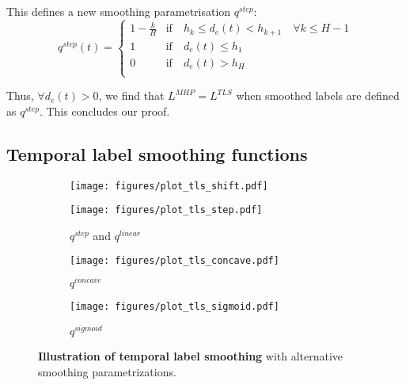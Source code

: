 \documentclass[nohyperref]{article}
\begin{document}
This defines a new smoothing parametrisation $q^{step}$: \begin{equation*}
    q^{step}( t) = 
    \begin{cases}
    1-\frac{k}{H} & \mathrm{if} \quad  h_k \leq  d_e(t) < h_{k+1} \quad \forall k \leq H -1 \\
    1 & \mathrm{if}  \quad d_e(t) \leq h_1 \\     
    0 & \mathrm{if} \quad d_e(t) > h_H \\
    \end{cases}
\end{equation*}

Thus, $\forall d_e(t) > 0$, we find that $L^{MHP} = L^{TLS}$ when smoothed labels are defined as $q^{step}$. This concludes our proof. \hfill \qedsymbol

\subsection{Temporal label smoothing functions}
\label{appendix:temporal_smoothing_fn}

\begin{figure}[h]
\centering
\begin{subfigure}{0.49\textwidth}
  \centering
  \texttt{[image: figures/plot\_tls\_shift.pdf]}
  \caption{} \label{fig:qshift}
\end{subfigure}
\hspace{2pt}
\begin{subfigure}{0.49\textwidth}
  \centering
  \texttt{[image: figures/plot\_tls\_step.pdf]}
  \caption{\centering $q^{step}$ and $q^{linear}$}
  \label{fig:step_TLS}
\end{subfigure}
\vspace{0.5em}

\begin{subfigure}{0.49\textwidth}
  \centering
  \texttt{[image: figures/plot\_tls\_concave.pdf]}
  \caption{{\centering $q^{concave}$}} \label{fig:concave}
\end{subfigure}
\hspace{2pt}
\begin{subfigure}{0.49\textwidth}
  \centering
  \texttt{[image: figures/plot\_tls\_sigmoid.pdf]}
  \caption{\centering \centering $q^{sigmoid}$}
  \label{fig:sigmoid_TLS}
\end{subfigure}
\caption{\textbf{Illustration of temporal label smoothing} with alternative smoothing parametrizations.} \label{fig:TLS_other}
\end{figure}
\end{document}

